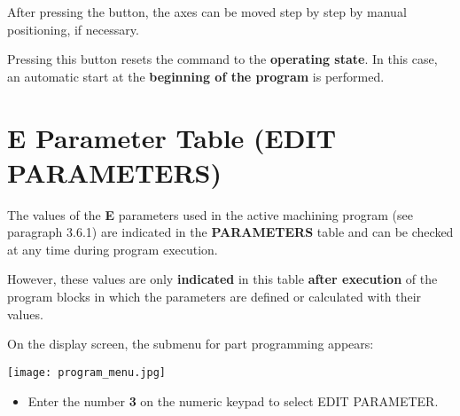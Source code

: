 \begin{itemize}
\end{itemize}

After pressing the button, the axes can be moved step by step by manual positioning, if necessary.

\begin{itemize}
\end{itemize}

Pressing this button resets the command to the \textbf{operating state}. In this case, an automatic start at the \textbf{beginning of the program} is performed.

\newpage

\section{E Parameter Table (EDIT PARAMETERS)}

The values of the \textbf{E} parameters used in the active machining program (see paragraph 3.6.1) are indicated in the \textbf{PARAMETERS} table and can be checked at any time during program execution.

However, these values are only \textbf{indicated} in this table \textbf{after execution} of the program blocks in which the parameters are defined or calculated with their values.

\procedure

\begin{itemize}
\end{itemize}
\vspace{.5cm}
\begin{itemize}
\end{itemize}

On the display screen, the submenu for part programming appears:

\begin{center}
    \texttt{[image: program\_menu.jpg]}
\end{center}

\newpage

\begin{itemize}
    \item Enter the number \textbf{3} on the numeric keypad to select EDIT PARAMETER.
\end{itemize}

